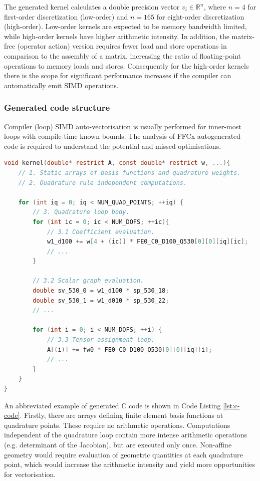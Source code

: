 The generated kernel calculates a double precision vector $v_i \in
\mathbb{R}^{n}$, where $n = 4$ for first-order discretization (low-order) and
$n = 165$ for eight-order discretization (high-order). Low-order kernels are
expected to be memory bandwidth limited, while high-order kernels have higher
arithmetic intensity. In addition, the matrix-free (operator action) version
requires fewer load and store operations in comparison to the assembly of a
matrix, increasing the ratio of floating-point operations to memory loads and
stores. Consequently for the high-order kernels there is the scope for
significant performance increases if the compiler can automatically emit SIMD
operations.

\subsubsection*{Generated code structure}

Compiler (loop) SIMD auto-vectorisation is usually performed for inner-most
loops with compile-time known bounds. The analysis of FFCx autogenerated code
is required to understand the potential and missed optimisations.

\lstset{style=CStyle}
\begin{lstlisting}[language=c,
    caption=Abbreviated FFCx generated finite element kernel.,
    basicstyle=\ttfamily\scriptsize,
    keywordstyle=\ttb\color{deepblue}\scriptsize,
    label=lst:c-code]
void kernel(double* restrict A, const double* restrict w, ...){
    // 1. Static arrays of basis functions and quadrature weights.
    // 2. Quadrature rule independent computations.

    for (int iq = 0; iq < NUM_QUAD_POINTS; ++iq) {
        // 3. Quadrature loop body.
        for (int ic = 0; ic < NUM_DOFS; ++ic){
            // 3.1 Coefficient evaluation.
            w1_d100 += w[4 + (ic)] * FE0_C0_D100_Q530[0][0][iq][ic];
            // ...
        }

        // 3.2 Scalar graph evaluation.
        double sv_530_0 = w1_d100 * sp_530_18;
        double sv_530_1 = w1_d010 * sp_530_22;
        // ...

        for (int i = 0; i < NUM_DOFS; ++i) {
            // 3.3 Tensor assignment loop.
            A[(i)] += fw0 * FE0_C0_D100_Q530[0][0][iq][i];
            // ...
        }
    }
}
\end{lstlisting}

An abbreviated example of generated C code is shown in Code Listing
\ref{lst:c-code}. Firstly, there are arrays defining finite element basis
functions at quadrature points. These require no arithmetic operations.
Computations independent of the quadrature loop contain more intense arithmetic
operations (e.g. determinant of the Jacobian), but are executed only once.
Non-affine geometry would require evaluation of geometric quantities at each
quadrature point, which would increase the arithmetic intensity and yield more
opportunities for vectorisation.

